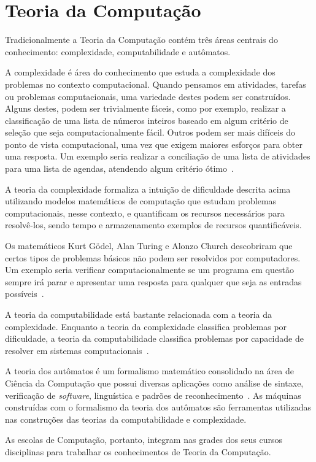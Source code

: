 \section{Teoria da Computação}
\label{sec-revisao-teocomp}
Tradicionalmente a Teoria da Computação contém três áreas centrais
do conhecimento: complexidade, computabilidade e autômatos.

A complexidade é área do conhecimento que estuda a complexidade
dos problemas no contexto computacional.
Quando pensamos em atividades, tarefas ou problemas computacionais,
uma variedade destes podem ser construídos.
Alguns destes, podem ser trivialmente fáceis, como por exemplo,
realizar a classificação de uma lista de números inteiros baseado
em algum critério de seleção que seja computacionalmente fácil.
Outros podem ser mais difíceis do ponto de vista computacional,
uma vez que exigem maiores esforços para obter uma resposta.
Um exemplo seria
realizar a conciliação de uma lista de atividades para uma lista
de agendas, atendendo algum critério
ótimo~\cite{sipser2006introduction}.

A teoria da complexidade formaliza a intuição de dificuldade descrita acima
utilizando modelos matemáticos de computação que estudam problemas
computacionais, nesse contexto, e quantificam os recursos necessários
para resolvê-los, sendo tempo e armazenamento exemplos de recursos
quantificáveis.

Os matemáticos Kurt G{\"o}del, Alan Turing e Alonzo Church descobriram que
certos tipos de problemas básicos não podem ser
resolvidos por computadores.
Um exemplo seria verificar computacionalmente se um programa em questão
sempre irá parar e apresentar uma resposta para qualquer que seja
as entradas possíveis~\cite{sipser2006introduction}.

A teoria da computabilidade está bastante relacionada com a teoria da complexidade.
Enquanto a teoria da complexidade classifica problemas por dificuldade, a teoria
da computabilidade classifica problemas por capacidade de resolver em sistemas
computacionais~\cite{sipser2006introduction}.

A teoria dos autômatos é um formalismo matemático consolidado na área de
Ciência da Computação que possui diversas aplicações como análise de sintaxe,
verificação de \textit{software}, linguística e padrões
de reconhecimento~\cite{pin2011elements}.
As máquinas construídas com o formalismo da teoria dos autômatos são ferramentas
utilizadas nas construções das teorias da computabilidade
e complexidade.

As escolas de Computação, portanto, integram nas grades dos seus cursos disciplinas
para trabalhar os conhecimentos de Teoria da Computação.
